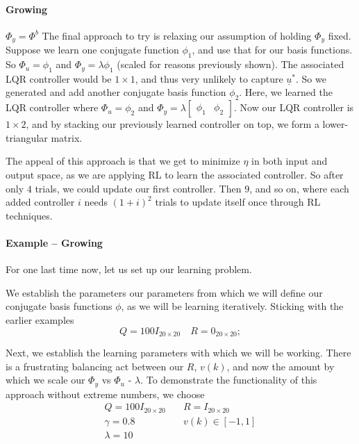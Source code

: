 

\FloatBarrier\paragraph{Growing} $\Phi_y = \Phi^b$
The final approach to try is relaxing our assumption of holding $\Phi_y$ fixed. 
Suppose we learn one conjugate function $\phi_1$, and use that for our basis functions. 
So $\Phi_u = \phi_1$ and $\Phi_y = \lambda\phi_1$ (scaled for reasons previously shown). 
The associated LQR controller would be $1 \times 1$, and thus very unlikely to capture $\underline{u}^\ast$. 
So we generated and add another conjugate basis function $\phi_2$. 
Here, we learned the LQR controller where $\Phi_u = \phi_2$ and $\Phi_y = \lambda\begin{bmatrix}\phi_1 & \phi_2\end{bmatrix}$. 
Now our LQR controller is $1 \times 2$, and by stacking our previously learned controller on top, we form a lower-triangular matrix. 

The appeal of this approach is that we get to minimize $\eta$ in both input and output space, as we are applying RL to learn the associated controller. So after only $4$ trials, we could update our first controller. Then $9$, and so on, where each added controller $i$ needs ${(1 + i)}^2$ trials to update itself once through RL techniques.

\FloatBarrier\paragraph{Example -- Growing}
For one last time now, let us set up our learning problem.

We establish the parameters our parameters from which we will define our conjugate basis functions $\phi$, as we will be learning iteratively. Sticking with the earlier examples
\begin{equation}
    Q = 100I_{20 \times 20}
    \quad
    R = 0_{20 \times 20};
\end{equation}

Next, we establish the learning parameters with which we will be working. There is a frustrating balancing act between our $R$, $v(k)$, and now the amount by which we scale our $\Phi_y$ vs $\Phi_u$ - $\lambda$. To demonstrate the functionality of this approach without extreme numbers, we choose
\begin{equation}
    \begin{split}
        Q = 100I_{20 \times 20}
        &\quad
        R = I_{20 \times 20}
        \\
        \gamma = 0.8
        &\quad
        v(k) \in [-1, 1]
        \\
        \lambda = 10
    \end{split}
\end{equation}

